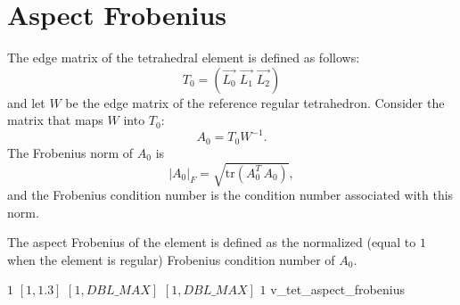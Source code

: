 \section{Aspect Frobenius\label{s:tet-aspect-Frobenius}}

The edge matrix of the tetrahedral element is defined as
follows:
\[
T_0 = (\vec{L_0}\;\vec{L_1}\;\vec{L_2})
\]
and let $W$ be the edge matrix of the reference regular tetrahedron.
Consider the matrix that maps $W$ into $T_0$:
\[
A_0 = T_0 W^{-1}.
\]
The Frobenius norm of $A_0$ is
\[
|A_0|_F = \sqrt{\mathrm{tr}(A_0^T\, A_0)},
\]
and the Frobenius condition number is the condition number associated
with this norm.

The aspect Frobenius of the element is defined as the normalized
(equal to $1$ when the element is regular) Frobenius condition number of $A_0$.

%
{$1$}%
{$[1,1.3]$}%
{$[1,DBL\_MAX]$}%
{$[1,DBL\_MAX]$}%
{$1$}%
{\cite{knu:00}}%
{v\_tet\_aspect\_frobenius}%
